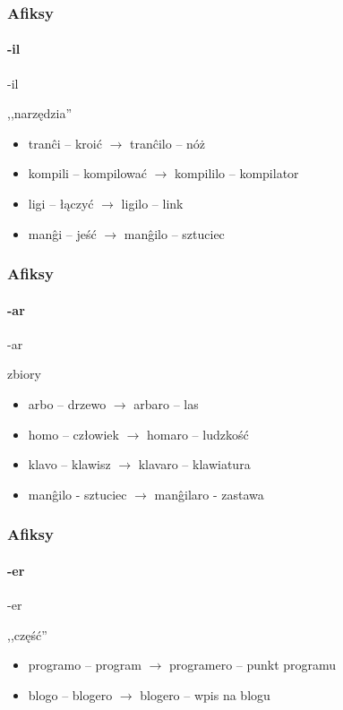 \documentclass{beamer}
\begin{document}
  \begin{frame}
  	\frametitle{Afiksy}
  	\framesubtitle{-il}
  	  	
  		\begin{block}{-il}
  			\begin{center}
  			,,narzędzia''
  			\end{center}
  		\end{block}
  	
  		\begin{itemize}
  			\item<1-> tranĉi -- kroić $\rightarrow$ tranĉilo -- nóż
  			\item<1-> kompili -- kompilować $\rightarrow$ kompililo -- kompilator
  			\item<1-> ligi -- łączyć $\rightarrow$ ligilo -- link
  			\item<2-> manĝi -- jeść $\rightarrow$ \pause manĝilo -- sztuciec
  		\end{itemize}
  \end{frame}

  \begin{frame}
  	\frametitle{Afiksy}
  	\framesubtitle{-ar}
  	  	
  		\begin{block}{-ar}
  			\begin{center}
  				zbiory
  			\end{center}
  		\end{block}
  	
  		\begin{itemize}
  			\item<1-> arbo -- drzewo $\rightarrow$ arbaro -- las
  			\item<1-> homo -- człowiek $\rightarrow$ homaro -- ludzkość
  			\item<1-> klavo -- klawisz $\rightarrow$ klavaro -- klawiatura
  			\item<2-> manĝilo - sztuciec $\rightarrow$ \pause manĝilaro - zastawa
  		\end{itemize}
  \end{frame}

  \begin{frame}
  	\frametitle{Afiksy}
  	\framesubtitle{-er}
  	  	
  		\begin{block}{-er}
  			\begin{center}
  			,,część''
  			\end{center}
  		\end{block}
  	
  		\begin{itemize}
			\item<1-> programo -- program $\rightarrow$ programero -- punkt programu
			\item<1-> blogo -- blogero $\rightarrow$ blogero -- wpis na blogu
			
  		\end{itemize}
  \end{frame}
\end{document}
